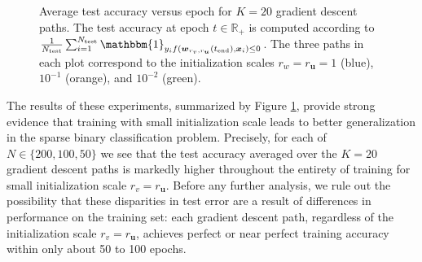 \documentclass{article}
\begin{document}
\begin{figure}[H]
\centering
{}\hfill
{}\par 
{}
\caption{Average test accuracy versus epoch for $K=20$ gradient descent paths. The test accuracy at epoch $t \in \mathbb{R}_+$ is computed according to $\frac{1}{N_{\text{test}}} \sum_{i=1}^{N_{\text{test}}} \mathbbm{1}_{y_i f(\boldsymbol{w}_{r_v, r_{\boldsymbol{u}}}(t_{\text{end}}), \boldsymbol{x}_i) \leq 0}$. The three paths in each plot correspond to the initialization scales $r_w = r_{\boldsymbol{u}} = 1$ (blue), $10^{-1}$ (orange), and $10^{-2}$ (green).}\label{fig:testerrlogistic}
\end{figure}

The results of these experiments, summarized by Figure \ref{fig:testerrlogistic}, provide strong evidence that training with small initialization scale leads to better generalization in the sparse binary classification problem. Precisely, for each of $N \in \{200, 100, 50\}$ we see that the test accuracy averaged over the $K=20$ gradient descent paths is markedly higher throughout the entirety of training for small initialization scale $r_v = r_{\boldsymbol{u}}$. Before any further analysis, we rule out the possibility that these disparities in test error are a result of differences in performance on the training set: each gradient descent path, regardless of the initialization scale $r_v = r_{\boldsymbol{u}}$, achieves perfect or near perfect training accuracy within only about 50 to 100 epochs.
\end{document}
